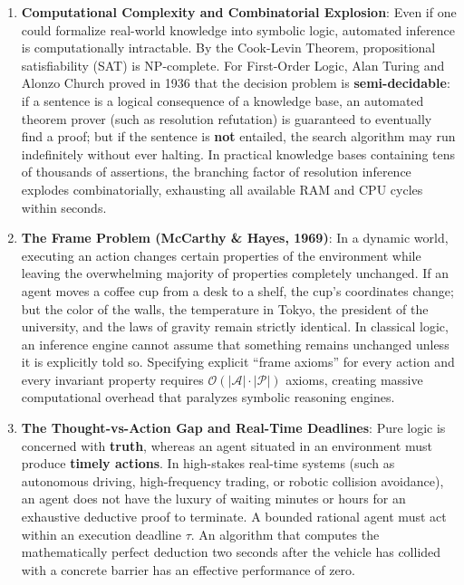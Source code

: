 \begin{enumerate}
  \item \textbf{Computational Complexity and Combinatorial Explosion}:
  Even if one could formalize real-world knowledge into symbolic logic, automated inference is computationally intractable. By the Cook-Levin Theorem, propositional satisfiability (SAT) is NP-complete. For First-Order Logic, Alan Turing and Alonzo Church proved in 1936 that the decision problem is \textbf{semi-decidable}: if a sentence is a logical consequence of a knowledge base, an automated theorem prover (such as resolution refutation) is guaranteed to eventually find a proof; but if the sentence is \textbf{not} entailed, the search algorithm may run indefinitely without ever halting. In practical knowledge bases containing tens of thousands of assertions, the branching factor of resolution inference explodes combinatorially, exhausting all available RAM and CPU cycles within seconds.

  \item \textbf{The Frame Problem (McCarthy \& Hayes, 1969)}:
  In a dynamic world, executing an action changes certain properties of the environment while leaving the overwhelming majority of properties completely unchanged. If an agent moves a coffee cup from a desk to a shelf, the cup's coordinates change; but the color of the walls, the temperature in Tokyo, the president of the university, and the laws of gravity remain strictly identical. In classical logic, an inference engine cannot assume that something remains unchanged unless it is explicitly told so. Specifying explicit ``frame axioms'' for every action and every invariant property requires $\mathcal{O}(|\mathcal{A}| \cdot |\mathcal{P}|)$ axioms, creating massive computational overhead that paralyzes symbolic reasoning engines.

  \item \textbf{The Thought-vs-Action Gap and Real-Time Deadlines}:
  Pure logic is concerned with \textbf{truth}, whereas an agent situated in an environment must produce \textbf{timely actions}. In high-stakes real-time systems (such as autonomous driving, high-frequency trading, or robotic collision avoidance), an agent does not have the luxury of waiting minutes or hours for an exhaustive deductive proof to terminate. A bounded rational agent must act within an execution deadline $\tau$. An algorithm that computes the mathematically perfect deduction two seconds after the vehicle has collided with a concrete barrier has an effective performance of zero.
\end{enumerate}

